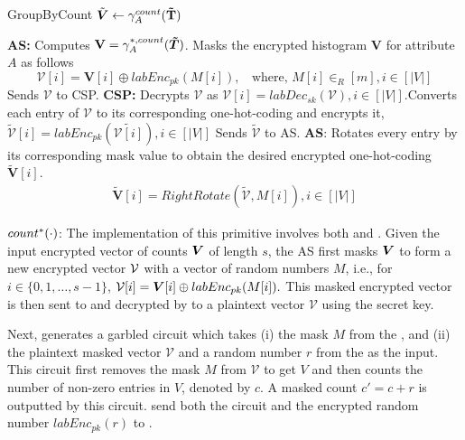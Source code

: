\begin{algorithm}[t]
	\small{
		\caption{\textsf{GroupByCount }$\tilde{\boldsymbol{V}} \leftarrow \gamma^{count}_A(\mathbf{\tilde{T}})$}
		\begin{algorithmic}[1]
			\STATEx \textbf{\textsf{AS}:} \STATE Computes $\mathbf{V}=\gamma^{*,count}_{A}(\boldsymbol{\tilde{T}})$.
			\STATE Masks the encrypted histogram $\mathbf{V}$ for attribute $A$ as follows 
			$$\boldsymbol{\mathcal{V}}[i]= \mathbf{V}[i] \oplus labEnc_{pk}(M[i]), ~~~~\text{where, }M[i] \in_R [m], i \in [|V|]$$
			\STATE Sends $\boldsymbol{\mathcal{V}}$ to \textsf{CSP}.
			\STATEx \textbf{\textsf{CSP}:}
			\STATE Decrypts  $\boldsymbol{\mathcal{V}}$ as $\mathcal{V}[i]=labDec_{sk}(\boldsymbol{\mathcal{V}}), i \in [|V|]$.\STATE Converts each entry of $\mathcal{V}$ to its corresponding one-hot-coding and encrypts it, $\boldsymbol{\tilde{\mathcal{V}}}[i]=labEnc_{pk}(\tilde{\mathcal{V}[i]}), i \in [|V|]$
			\STATE Sends $\boldsymbol{\tilde{\mathcal{V}}}$ to \textsf{AS}.
			\STATEx \textbf{\textsf{AS}}:
			\STATE  Rotates every entry by its corresponding mask value to obtain the desired  encrypted one-hot-coding $\boldsymbol{\tilde{V}}[i]$. \begin{gather*}\boldsymbol{\tilde{V}}[i]=RightRotate(\boldsymbol{\tilde{\mathcal{V}}},M[i]), i \in [|V|]\end{gather*} 
		\end{algorithmic} \label{groupby-imp}}
\end{algorithm} 

  $count^*(\cdot)$: The implementation of this primitive involves both \AS and \CPS. Given the input encrypted vector of counts $\boldsymbol{V}$ of length $s$, the AS first masks $\boldsymbol{V}$ to form a new encrypted vector ${\bf \mathcal{V}}$ with a vector of random numbers $M$, i.e., for $i\in \{0,1,\ldots, s-1\}$,
${\bf \mathcal{V}}[i] = {\boldsymbol{V}}[i] \oplus labEnc_{pk}(M[i]).$
This masked encrypted vector is then sent to \CPS and decrypted by \CPS to a plaintext vector $\mathcal{V}$ using the secret key.

Next, \CPS generates a garbled circuit which takes (i) the mask $M$ from the \AS, and (ii) the plaintext  masked vector $\mathcal{V}$ and a random number $r$  from the \CPS as the input. This circuit first removes the mask $M$ from $\mathcal{V}$ to get $V$ and then counts the number of non-zero entries in $V$, denoted by $c$. A masked count $c'=c+r$ is outputted by this circuit. \CPS send both the circuit and the encrypted random number $labEnc_{pk}(r)$  to \AS.

